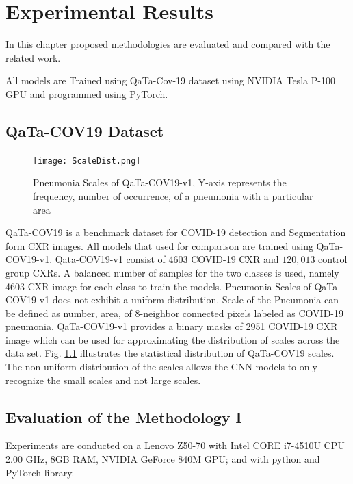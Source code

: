 
\chapter{Experimental Results} %

\label{chp:results} %
In this chapter proposed methodologies are evaluated and compared with the related work.

All models are Trained using QaTa-Cov-19 \cite{ahishali2021advance} dataset using NVIDIA Tesla P-100 GPU and programmed using PyTorch.
\section{QaTa-COV19 Dataset}
\begin{center}
    \begin{figure}[htbp]
    \centerline{\texttt{[image: ScaleDist.png]}}
    \caption{Pneumonia Scales of QaTa-COV19-v1, Y-axis represents the frequency, number of occurrence, of a pneumonia with a particular area}
    \label{pdist}
    \end{figure}
    \end{center}
QaTa-COV19 is a benchmark dataset for COVID-19 detection and Segmentation form CXR images. All models that used for comparison are trained using QaTa-COV19-v1. Qata-COV19-v1 consist of 4603 COVID-19 CXR and $120,013$ control group CXRs. A balanced number of samples for the two classes is used, namely 4603 CXR image for each class to train the models. Pneumonia Scales of QaTa-COV19-v1 does not exhibit a uniform distribution. Scale of the Pneumonia can be defined as number, area, of 8-neighbor connected pixels labeled as COVID-19 pneumonia. QaTa-COV19-v1 provides a binary masks of 2951 COVID-19 CXR image which can be used for approximating the distribution of scales across the data set. Fig. \ref{pdist} illustrates the statistical distribution of QaTa-COV19 scales. The non-uniform distribution of the scales allows the CNN models to only recognize the small scales and not large scales.

\section{Evaluation of the Methodology I}

Experiments are conducted on a Lenovo Z50-70 with Intel CORE i7-4510U CPU 2.00 GHz, 8GB RAM, NVIDIA GeForce 840M GPU; and with python and PyTorch library.

